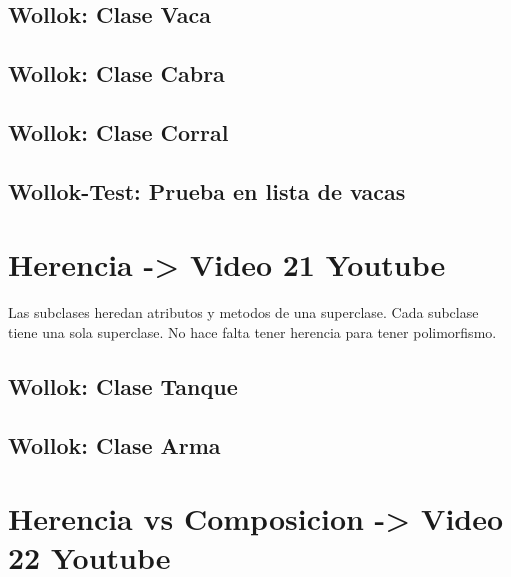 \documentclass[11pt,a4paper]{article}
\begin{document}
\subsection{Wollok: Clase Vaca}


\subsection{Wollok: Clase Cabra}


\subsection{Wollok: Clase Corral}


\subsection{Wollok-Test: Prueba en lista de vacas}

\newpage
\section{Herencia -> Video 21 Youtube}
Las subclases heredan atributos y metodos de una superclase. Cada subclase tiene una sola superclase. No hace falta tener herencia para tener polimorfismo.

\subsection{Wollok: Clase Tanque}


\subsection{Wollok: Clase Arma}


\newpage
\section{Herencia vs Composicion -> Video 22 Youtube}
\end{document}
